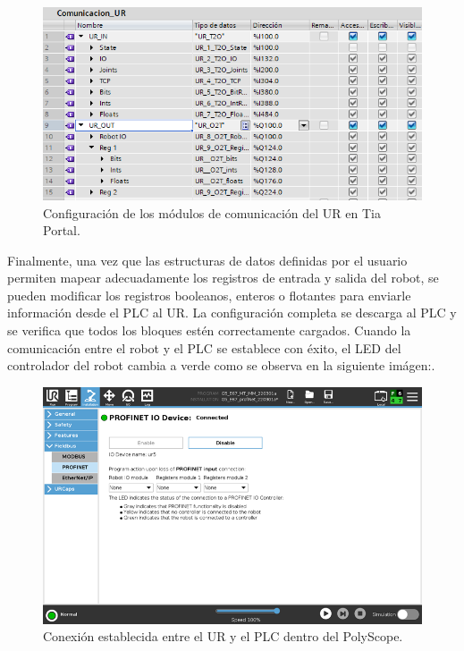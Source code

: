 \clearpage

\begin{figure} [h!]
  \begin{center}
    \includegraphics[width=13cm]{figs/com_plc_ur}
  \end{center}
  \caption{\centering Configuración de los módulos de comunicación del UR en Tia Portal.}
  \label{fig:com_plc_ur}
\end{figure} 

Finalmente, una vez que las estructuras de datos definidas por el usuario permiten mapear adecuadamente los registros de entrada y salida del robot, se pueden modificar los registros booleanos, enteros o flotantes para enviarle información desde el PLC al UR. La configuración completa se descarga al PLC y se verifica que todos los bloques estén correctamente cargados. Cuando la comunicación entre el robot y el PLC se establece con éxito, el LED del controlador del robot cambia a verde como se observa en la siguiente imágen:.

\begin{figure} [h!]
  \begin{center}
    \includegraphics[width=12cm]{figs/ur_conectado_plc}
  \end{center}
  \caption{\centering Conexión establecida entre el UR y el PLC dentro del PolyScope. \cite{guia_profinet}}
  \label{fig:ur_conectado_plc}
\end{figure} 

